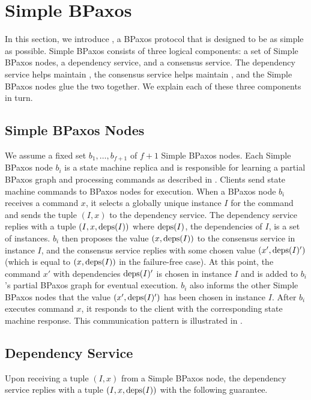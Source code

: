 \section{Simple BPaxos}
In this section, we introduce , a BPaxos protocol that
is designed to be as simple as possible.
%
Simple BPaxos consists of three logical components: a set of Simple BPaxos
nodes, a dependency service, and a consensus service. The dependency service
helps maintain , the consensus service helps maintain
, and the Simple BPaxos nodes glue the two together.
We explain each of these three components in turn.

\subsection{Simple BPaxos Nodes}

We assume a fixed set $b_1, \ldots, b_{f+1}$ of $f + 1$ Simple BPaxos nodes.
Each Simple BPaxos node $b_i$ is a state machine replica and is responsible for
learning a partial BPaxos graph and processing commands as described in
.
%
Clients send state machine commands to BPaxos nodes for execution. When a
BPaxos node $b_i$ receives a command $x$, it selects a globally unique instance
$I$ for the command and sends the tuple $(I, x)$ to the dependency service. The
dependency service replies with a tuple $(I, x, \text{deps}(I))$ where $\text{deps}(I)$,
the dependencies of $I$, is a set of instances.
%
$b_i$ then proposes the value $(x, \text{deps}(I))$ to the consensus service in
instance $I$, and the consensus service replies with some chosen value $(x',
\text{deps}(I)')$ (which is equal to $(x, \text{deps}(I))$ in the failure-free case). At
this point, the command $x'$ with dependencies $\text{deps}(I)'$ is chosen in instance
$I$ and is added to $b_i$'s partial BPaxos graph for eventual execution. $b_i$
also informs the other Simple BPaxos nodes that the value $(x', \text{deps}(I)')$ has
been chosen in instance $I$.
%
After $b_i$ executes command $x$, it responds to the client with the
corresponding state machine response.
%
This communication pattern is illustrated in .

\subsection{Dependency Service}
Upon receiving a tuple $(I, x)$ from a Simple BPaxos node, the dependency
service replies with a tuple $(I, x, \text{deps}(I))$ with the following guarantee.

